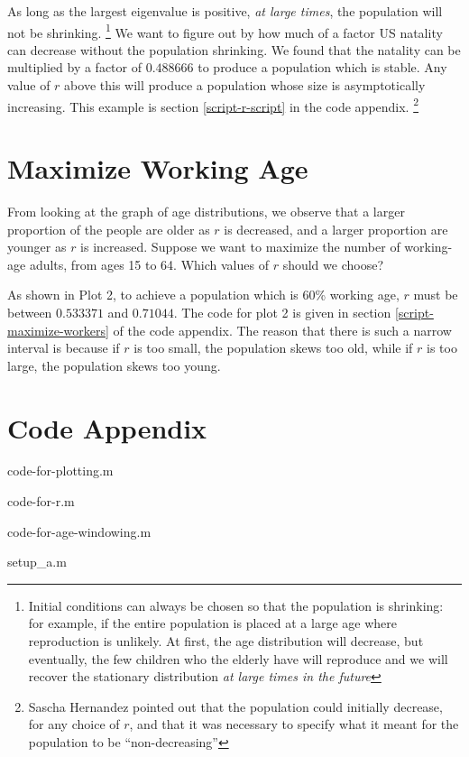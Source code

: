\documentclass{article}
\begin{document}
As long as the largest eigenvalue is positive, \emph{at large times}, the population
	will not be shrinking.
	\footnote{Initial conditions can always be chosen so that the population is shrinking:
		for example, if the entire population is placed at a large age where 
		reproduction is unlikely.
	At first, the age distribution will decrease, but eventually, the few children who
		the elderly have will reproduce and we will recover the stationary distribution
		\emph{at large times in the future}}
We want to figure out by how much of a factor US natality can decrease without the 
	population shrinking.
We found that the natality can be multiplied by a factor of $0.488666$ to produce
	a population which is stable.
Any value of $r$ above this will produce a population whose size is asymptotically 
	increasing.
This example is section \ref{script-r-script} in the code appendix.
	\footnote{Sascha Hernandez pointed out that the population could initially
		decrease, for any choice of $r$, and that it was necessary to specify
		what it meant for the population to be ``non-decreasing''}

\section{Maximize Working Age}

From looking at the graph of age distributions, we observe that a larger proportion
	of the people are older as $r$ is decreased, and a larger proportion are younger
	as $r$ is increased.
Suppose we want to maximize the number of working-age adults, from ages 15 to 64.
Which values of $r$ should we choose?

As shown in Plot 2, to achieve a population which is 60\% working age,
	$r$ must be between $0.533371$ and $0.71044$.
The code for plot 2 is given in section \ref{script-maximize-workers} of the code appendix.
The reason that there is such a narrow interval is because if $r$ is too small,
	the population skews too old, while if $r$ is too large, the population
	skews too young.

\section{Code Appendix}


	{code-for-plotting.m}


	{code-for-r.m}


	{code-for-age-windowing.m}


	{setup_a.m}
\end{document}
